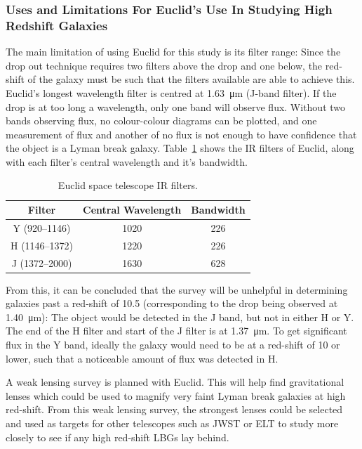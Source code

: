 	\subsubsection{Uses and Limitations For Euclid’s Use In Studying High Redshift Galaxies} %
	\label{ssub:uses_and_limitations_for_euclid_s_use_in_studying_high_redshift_galaxies}
		The main limitation of using Euclid for this study is its filter range: Since the drop out technique requires two filters above the drop and one below, the red-shift of the galaxy must be such that the filters available are able to achieve this. Euclid’s longest wavelength filter is centred at \SI{1.63}{\micro\metre} (J-band filter). If the drop is at too long a wavelength, only one band will observe flux. Without two bands observing flux, no colour-colour diagrams can be plotted, and one measurement of flux and another of no flux is not enough to have confidence that the object is a Lyman break galaxy. Table~\ref{fig:euclid_ir_filters} shows the IR filters of Euclid, along with each filter's central wavelength and it’s bandwidth.
		\begin{table}[ht]
			\centering
				\begin{tabular}{c|c|c}
					Filter & Central Wavelength & Bandwidth \\
					\hline\hline
					Y (920--1146) & 1020 & 226 \\
					H (1146--1372) & 1220 & 226 \\
					J (1372--2000) & 1630 & 628 \\
				\end{tabular}
				\caption{Euclid space telescope IR filters.\label{fig:euclid_ir_filters}}
		\end{table}

		From this, it can be concluded that the survey will be unhelpful in determining galaxies past a red-shift of 10.5 (corresponding to the drop being observed at \SI{1.40}{\micro\metre}): The object would be detected in the J band, but not in either H or Y. The end of the H filter and start of the J filter is at \SI{1.37}{\micro\metre}. To get significant flux in the Y band, ideally the galaxy would need to be at a red-shift of 10 or lower, such that a noticeable amount of flux was detected in H.

		A weak lensing survey is planned with Euclid. This will help find gravitational lenses which could be used to magnify very faint Lyman break galaxies at high red-shift. From this weak lensing survey, the strongest lenses could be selected and used as targets for other telescopes such as JWST or ELT to study more closely to see if any high red-shift LBGs lay behind.

